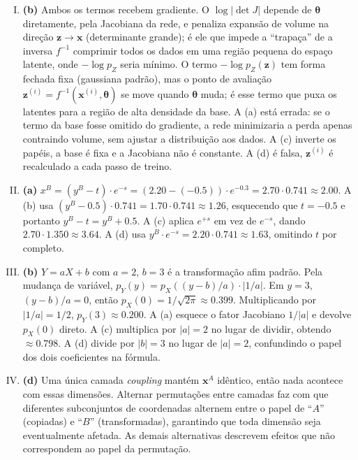 \documentclass{dlproblemset}
\newcommand{\thetav}{\boldsymbol{\theta}}
\begin{document}
\begin{enumerate}[I)]
    \item \textbf{(b)} Ambos os termos recebem gradiente. O $\log|\det J|$ depende de $\thetav$ diretamente, pela Jacobiana da rede, e penaliza expansão de volume na direção $\mathbf{z} \to \mathbf{x}$ (determinante grande); é ele que impede a ``trapaça'' de a inversa $f^{-1}$ comprimir todos os dados em uma região pequena do espaço latente, onde $-\log p_Z$ seria mínimo. O termo $-\log p_Z(\mathbf{z})$ tem forma fechada fixa (gaussiana padrão), mas o ponto de avaliação $\mathbf{z}^{(i)} = f^{-1}(\mathbf{x}^{(i)}, \thetav)$ se move quando $\thetav$ muda; é esse termo que puxa os latentes para a região de alta densidade da base. A (a) está errada: se o termo da base fosse omitido do gradiente, a rede minimizaria a perda apenas contraindo volume, sem ajustar a distribuição aos dados. A (c) inverte os papéis, a base é fixa e a Jacobiana não é constante. A (d) é falsa, $\mathbf{z}^{(i)}$ é recalculado a cada passo de treino.

    \item \textbf{(a)} $x^B = (y^B - t) \cdot e^{-s} = (2.20 - (-0.5)) \cdot e^{-0.3} = 2.70 \cdot 0.741 \approx 2.00$. A (b) usa $(y^B - 0.5) \cdot 0.741 = 1.70 \cdot 0.741 \approx 1.26$, esquecendo que $t = -0.5$ e portanto $y^B - t = y^B + 0.5$. A (c) aplica $e^{+s}$ em vez de $e^{-s}$, dando $2.70 \cdot 1.350 \approx 3.64$. A (d) usa $y^B \cdot e^{-s} = 2.20 \cdot 0.741 \approx 1.63$, omitindo $t$ por completo.

    \item \textbf{(b)} $Y = aX + b$ com $a = 2$, $b = 3$ é a transformação afim padrão. Pela mudança de variável, $p_Y(y) = p_X((y - b)/a) \cdot |1/a|$. Em $y = 3$, $(y - b)/a = 0$, então $p_X(0) = 1/\sqrt{2\pi} \approx 0.399$. Multiplicando por $|1/a| = 1/2$, $p_Y(3) \approx 0.200$. A (a) esquece o fator Jacobiano $1/|a|$ e devolve $p_X(0)$ direto. A (c) multiplica por $|a| = 2$ no lugar de dividir, obtendo $\approx 0.798$. A (d) divide por $|b| = 3$ no lugar de $|a| = 2$, confundindo o papel dos dois coeficientes na fórmula.

    \item \textbf{(d)} Uma única camada \textit{coupling} mantém $\mathbf{x}^A$ idêntico, então nada acontece com essas dimensões. Alternar permutações entre camadas faz com que diferentes subconjuntos de coordenadas alternem entre o papel de ``$A$'' (copiadas) e ``$B$'' (transformadas), garantindo que toda dimensão seja eventualmente afetada. As demais alternativas descrevem efeitos que não correspondem ao papel da permutação.


\end{enumerate}
\end{document}
